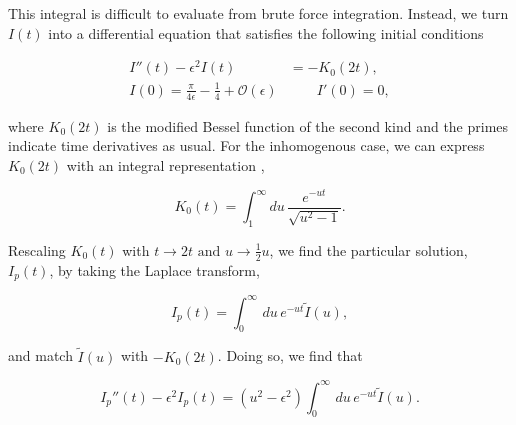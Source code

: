 \documentclass{article}
\numberwithin{equation}{section} %
\begin{document}
\noindent This integral is difficult to evaluate from brute force integration. Instead, we turn $I(t)$ into a differential equation that satisfies the following initial conditions

\begin{equation}
\begin{split}
I''(t) - \epsilon^2I(t) &= -K_0(2t),\\
I(0) = \frac{\pi}{4\epsilon} - \frac{1}{4} + \mathcal{O}(\epsilon) &\quad \quad I'(0) = 0,
\end{split}
\label{diff eq I}
\end{equation}

\noindent where $K_0(2t)$ is the modified Bessel function of the second kind\cite{bessel} and the primes indicate time derivatives as usual. For the inhomogenous case, we can express $K_0(2t)$ with an integral representation \cite{bessel},

%
%

\begin{equation}
K_0(t) = \int^\infty_1 du \, \frac{e^{-ut}}{\sqrt{u^2-1}}.
\end{equation}

%

\noindent Rescaling $K_0(t)$ with $t\rightarrow 2t\,\, \mathrm{and\,}\, u \rightarrow \frac{1}{2}u$, we find the particular solution, $I_p(t)$, by taking the Laplace transform\cite{laplace},

\begin{equation}
I_p(t) = \int^\infty_0 \, du \, e^{-ut} \tilde{I}(u),
\end{equation}

\noindent and match $\tilde{I}(u)$ with $-K_0(2t)$. Doing so, we find that

\begin{equation}
I_p''(t) - \epsilon^2 I_p(t) = (u^2-\epsilon^2)\int^\infty_0 \, du \, e^{-ut} \tilde{I}(u).
\end{equation}
\end{document}
